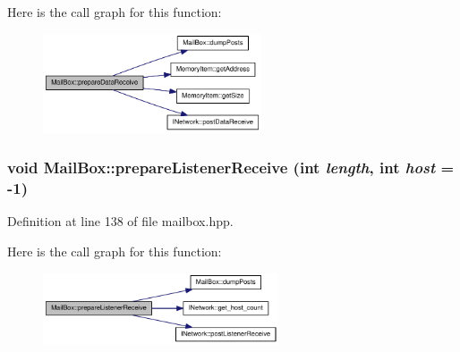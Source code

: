 Here is the call graph for this function:\nopagebreak
\begin{figure}[H]
\begin{center}
\leavevmode
\includegraphics[width=183pt]{class_mail_box_a467ff1952f56669a619092d57824637d_cgraph}
\end{center}
\end{figure}
\hypertarget{class_mail_box_aa9c92ef9ed35dbd1ebc4aae5f16876bd}{
\subsubsection[{prepareListenerReceive}]{\setlength{\rightskip}{0pt plus 5cm}void MailBox::prepareListenerReceive (int {\em length}, \/  int {\em host} = {\ttfamily -\/1})}}
\label{class_mail_box_aa9c92ef9ed35dbd1ebc4aae5f16876bd}


Definition at line 138 of file mailbox.hpp.

Here is the call graph for this function:\nopagebreak
\begin{figure}[H]
\begin{center}
\leavevmode
\includegraphics[width=197pt]{class_mail_box_aa9c92ef9ed35dbd1ebc4aae5f16876bd_cgraph}
\end{center}
\end{figure}


